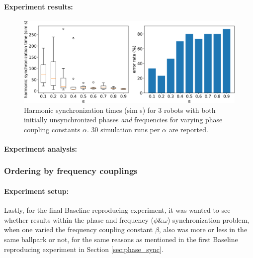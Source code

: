 			\paragraph{Experiment results:\nl}
			
			\begin{figure}[ht!]
				\centering
				\includegraphics[width=\linewidth]{Assets/DocSegments/Chapters/ExperimentsAndResults/Figures/PerfScores/stable_baseline_reproducing_phase_and_freq_sync_for_alpha.pdf}
				\caption[Experiment results for $\phi$ \& $\omega$ synchronization baseline reproduction and stabilization experiment.]{Harmonic synchronization times (sim s) for 3 robots with both initially unsynchronized phases \textit{and} frequencies for varying phase coupling constants $\alpha$. 30 simulation runs per $\alpha$ are reported.}
				\label{fig:stable_baseline_reproducing_phase_and_freq_sync_for_alpha}
			\end{figure}
			
			\paragraph{Experiment analysis:\nl}
			
	
		\subsubsection{Ordering by frequency couplings}
		
		\paragraph{Experiment setup:\nl}
		
		Lastly, for the final Baseline reproducing experiment, it was wanted to see whether results within the phase and frequency ($\phi\&\omega$) synchronization problem, when one varied the frequency coupling constant $\beta$, also was more or less in the same ballpark or not, for the same reasons as mentioned in the first Baseline reproducing experiment in Section \ref{sec:phase_sync}.
		
